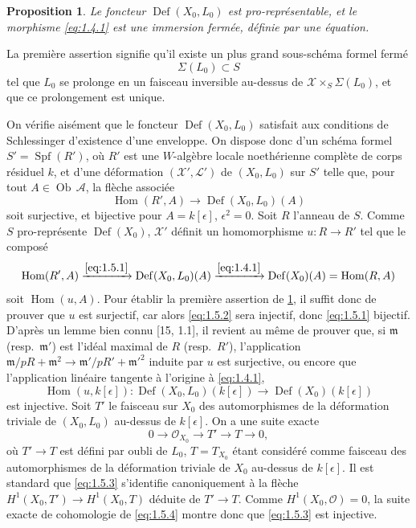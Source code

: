 \documentclass[12pt,a4paper]{article}
\theoremstyle{plain}
\newtheorem{proposition}[theorem]{Proposition}
\theoremstyle{definition}
\theoremstyle{remark}
\DeclareMathOperator{\Def}{Def}
\DeclareMathOperator{\Spf}{Spf}
\DeclareMathOperator{\Hom}{Hom}
\DeclareMathOperator{\Ob}{Ob}
\begin{document}
\begin{proposition}\label{prop:1.5}
Le foncteur $\Def(X_0, L_0)$ est pro-représentable, et le morphisme \eqref{eq:1.4.1} est une immersion fermée, définie par une équation.
\end{proposition}

La première assertion signifie qu'il existe un plus grand sous-schéma formel fermé
\begin{equation}\label{eq:1.5.0}
\Sigma(L_0) \subset S
\end{equation}
tel que $L_0$ se prolonge en un faisceau inversible au-dessus de $\mathcal{X} \times_S \Sigma(L_0)$, et que ce prolongement est unique.

On vérifie aisément que le foncteur $\Def(X_0, L_0)$ satisfait aux conditions de Schlessinger d'existence d'une enveloppe. On dispose donc d'un schéma formel $S' = \Spf(R')$, où $R'$ est une $W$-algèbre locale noethérienne complète de corps résiduel $k$, et d'une déformation $(\mathcal{X}', \mathcal{L}')$ de $(X_0, L_0)$ sur $S'$ telle que, pour tout $A \in \Ob\,\mathcal{A}$, la flèche associée
\begin{equation}\label{eq:1.5.1}
\Hom(R', A) \to \Def(X_0, L_0)(A)
\end{equation}
soit surjective, et bijective pour $A = k[\epsilon]$, $\epsilon^2 = 0$. Soit $R$ l'anneau de $S$. Comme $S$ pro-représente $\Def(X_0)$, $\mathcal{X}'$ définit un homomorphisme $u: R \to R'$ tel que le composé
\begin{equation}\label{eq:1.5.2}
\Hom(R', A) \xrightarrow{\eqref{eq:1.5.1}} \Def(X_0, L_0)(A) \xrightarrow{\eqref{eq:1.4.1}} \Def(X_0)(A) = \Hom(R, A)
\end{equation}
soit $\Hom(u, A)$. Pour établir la première assertion de \ref{prop:1.5}, il suffit donc de prouver que $u$ est surjectif, car alors \eqref{eq:1.5.2} sera injectif, donc \eqref{eq:1.5.1} bijectif. D'après un lemme bien connu [15, 1.1], il revient au même de prouver que, si $\mathfrak{m}$ (resp.~$\mathfrak{m}'$) est l'idéal maximal de $R$ (resp.~$R'$), l'application $\mathfrak{m}/pR + \mathfrak{m}^2 \to \mathfrak{m}'/pR' + \mathfrak{m}'^2$ induite par $u$ est surjective, ou encore que l'application linéaire tangente à l'origine à \eqref{eq:1.4.1},
\begin{equation}\label{eq:1.5.3}
\Hom(u, k[\epsilon]): \Def(X_0, L_0)(k[\epsilon]) \to \Def(X_0)(k[\epsilon])
\end{equation}
est injective. Soit $T'$ le faisceau sur $X_0$ des automorphismes de la déformation triviale de $(X_0, L_0)$ au-dessus de $k[\epsilon]$. On a une suite exacte
\begin{equation}\label{eq:1.5.4}
0 \to \mathcal{O}_{X_0} \to T' \to T \to 0,
\end{equation}
où $T' \to T$ est défini par oubli de $L_0$, $T = T_{X_0}$ étant considéré comme faisceau des automorphismes de la déformation triviale de $X_0$ au-dessus de $k[\epsilon]$. Il est standard que \eqref{eq:1.5.3} s'identifie canoniquement à la flèche $H^1(X_0, T') \to H^1(X_0, T)$ déduite de $T' \to T$. Comme $H^1(X_0, \mathcal{O}) = 0$, la suite exacte de cohomologie de \eqref{eq:1.5.4} montre donc que \eqref{eq:1.5.3} est injective.
\end{document}

